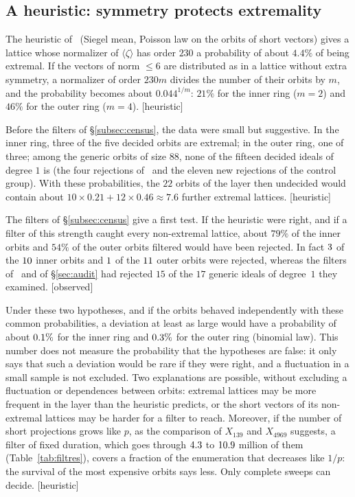 \documentclass[11pt,a4paper]{amsart}
\theoremstyle{plain}
\theoremstyle{definition}
\newcommand{\st}[1]{\textup{\textsf{\small[#1]}}}
\newcommand{\CONS}{\st{observed}}
\newcommand{\HEUR}{\st{heuristic}}
\begin{document}
\subsection{A heuristic: symmetry protects extremality}\label{subsec:heur}
The heuristic of~\cite[(Q2)]{Gau26} (Siegel mean, Poisson law on the orbits of short vectors) gives a lattice whose normalizer of $\langle\zeta\rangle$ has order $230$ a probability of about $4.4\%$ of being extremal. If the vectors of norm $\le6$ are distributed as in a lattice without extra symmetry, a normalizer of order $230m$ divides the number of their orbits by $m$, and the probability becomes about $0.044^{1/m}$: $21\%$ for the inner ring ($m=2$) and $46\%$ for the outer ring ($m=4$). \HEUR

Before the filters of \S\ref{subsec:census}, the data were small but suggestive. In the inner ring, three of the five decided orbits are extremal; in the outer ring, one of three; among the generic orbits of size $88$, none of the fifteen decided ideals of degree $1$ is (the four rejections of~\cite{Gau26} and the eleven new rejections of the control group). With these probabilities, the $22$ orbits of the layer then undecided would contain about $10\times0.21+12\times0.46\approx7.6$ further extremal lattices. \HEUR

The filters of \S\ref{subsec:census} give a first test. If the heuristic were right, and if a filter of this strength caught every non-extremal lattice, about $79\%$ of the inner orbits and $54\%$ of the outer orbits filtered would have been rejected. In fact $3$ of the $10$ inner orbits and $1$ of the $11$ outer orbits were rejected, whereas the filters of~\cite{Gau26} and of \S\ref{sec:audit} had rejected $15$ of the $17$ generic ideals of degree~$1$ they examined. \CONS

Under these two hypotheses, and if the orbits behaved independently with these common probabilities, a deviation at least as large would have a probability of about $0.1\%$ for the inner ring and $0.3\%$ for the outer ring (binomial law). This number does not measure the probability that the hypotheses are false: it only says that such a deviation would be rare if they were right, and a fluctuation in a small sample is not excluded. Two explanations are possible, without excluding a fluctuation or dependences between orbits: extremal lattices may be more frequent in the layer than the heuristic predicts, or the short vectors of its non-extremal lattices may be harder for a filter to reach. Moreover, if the number of short projections grows like $p$, as the comparison of $X_{139}$ and $X_{4969}$ suggests, a filter of fixed duration, which goes through $4.3$ to $10.9$ million of them (Table~\ref{tab:filtres}), covers a fraction of the enumeration that decreases like $1/p$: the survival of the most expensive orbits says less. Only complete sweeps can decide. \HEUR
\end{document}
